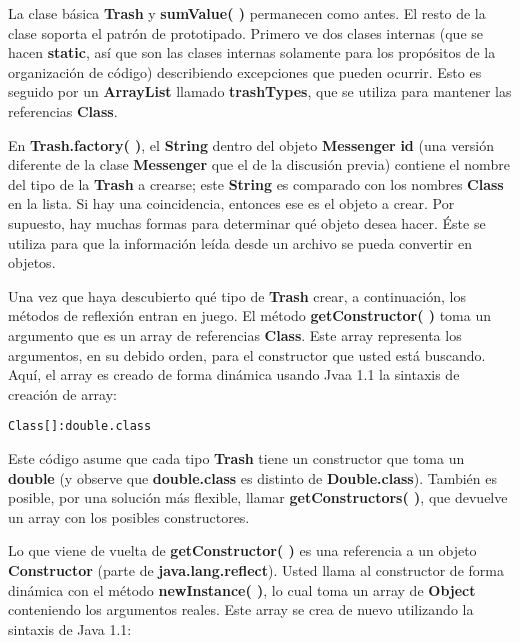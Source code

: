 La clase básica \textbf{Trash} y \textbf{sumValue( )} permanecen como antes. El resto de la clase soporta el patrón de prototipado. Primero ve dos clases internas (que se hacen \textbf{static}, así que son las clases internas solamente para los propósitos de la organización de código) describiendo excepciones que pueden ocurrir. Esto es seguido por un  \textbf{ArrayList} llamado \textbf{trashTypes}, que se utiliza para mantener las referencias \textbf{Class}.    \newline

En \textbf{Trash.factory( )}, el \textbf{String} dentro del objeto \textbf{Messenger} \textbf{id} (una versión diferente de la clase \textbf{Messenger} que el de la discusión previa) contiene el nombre del tipo de la \textbf{Trash} a crearse; este \textbf{String} es comparado con los nombres \textbf{Class} en la lista. Si hay una coincidencia, entonces ese es el objeto a crear. Por supuesto, hay muchas formas para determinar qué objeto desea hacer. Éste se utiliza para que la información leída desde un archivo se pueda convertir en objetos.    \newline

Una vez que haya descubierto qué tipo de \textbf{Trash} crear, a continuación, los métodos de reflexión entran en juego. El método \textbf{getConstructor( )} toma un argumento que es un array de referencias \textbf{Class}. Este array representa los argumentos, en su debido orden, para el constructor que usted está buscando. Aquí, el array es creado de forma dinámica usando Jvaa 1.1 la sintaxis de creación de array:  \newline

\begin{lstlisting} 
Class[]:double.class
\end{lstlisting}

Este código asume que cada tipo \textbf{Trash} tiene un constructor que toma un \textbf{double} (y observe que \textbf{double.class} es distinto de \textbf{Double.class}). También es posible, por una solución más flexible, llamar \textbf{getConstructors( )}, que devuelve un array con los posibles constructores.  \newline

Lo que viene de vuelta de \textbf{getConstructor( )} es una referencia a un objeto \textbf{Constructor} (parte de \textbf{java.lang.reflect}). Usted llama al constructor de forma dinámica con el método \textbf{newInstance( )}, lo cual toma un array de \textbf{Object} conteniendo los argumentos reales. Este array se crea de nuevo utilizando la sintaxis de Java 1.1:    \newline

